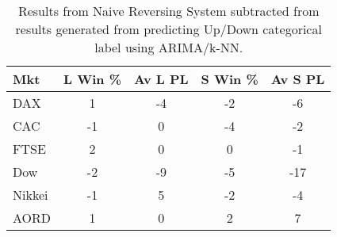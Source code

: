 \begin{table}[ht]
\centering
\caption[Naive Reversing System subtracted from ARIMA/k-NN predictions]{Results from Naive Reversing System subtracted from results generated from predicting Up/Down categorical label using ARIMA/k-NN.} 
\label{tab:chp_ts:pUD_CAT_arima_knn_sys_diff}
\begin{tabular}{lcccc}
  \toprule Mkt & L Win \% & Av L PL & S Win \% & Av S PL \\ 
  \midrule DAX & 1 & -4 & -2 & -6 \\ 
  CAC & -1 & 0 & -4 & -2 \\ 
  FTSE & 2 & 0 & 0 & -1 \\ 
  Dow & -2 & -9 & -5 & -17 \\ 
  Nikkei & -1 & 5 & -2 & -4 \\ 
  AORD & 1 & 0 & 2 & 7 \\ 
   \bottomrule \end{tabular}
\end{table}
